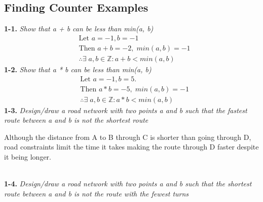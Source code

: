 \subsection*{Finding Counter Examples}

\textbf{1-1.} \emph{Show that a + b can be less than min(a, b)} 
{\color{answer}{}
\begin{align*}
  &\text{Let } a = -1, b = -1 \\
  &\text{Then } a + b = -2, \; min(a,b) = -1 \\
  &\therefore \exists \; a, b \in \mathbb{Z} : a+b < min(a,b) 
\end{align*}}
\textbf{1-2.} \emph{Show that a * b can be less than min(a, b)}
{\color{answer}{}
\begin{align*} 
	  &\text{Let } a = -1, b = 5. \\
	  &\text{Then } a*b = -5, \; min(a,b) = -1\\
	  &\therefore \exists \; a, b \in \mathbb{Z} : a*b < min(a,b)
\end{align*}}
\textbf{1-3.} \emph{Design/draw a road network with two points a and b such that the fastest route between a and b is not the shortest route}
{\color{answer}{}
\begin{center}
\end{center}
Although the distance from A to B through C is shorter than going through D, road constraints limit the time it takes making the route through D faster despite it being longer. } \\
\textbf{1-4.} \emph{Design/draw a road network with two points a and b such that the shortest route between a and b is not the route with the fewest turns} \\
{\color{answer}{}
\begin{center}
\end{center}
}

